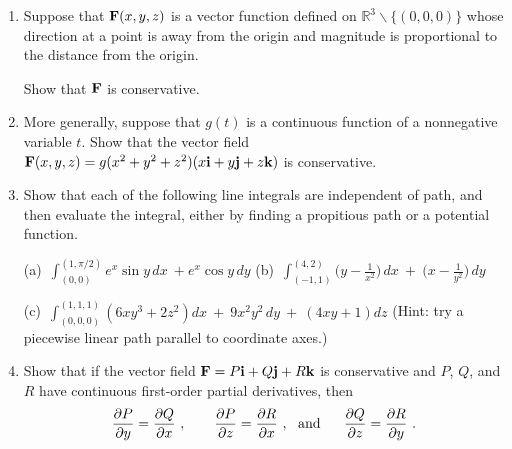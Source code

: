 \documentclass[12pt]{article}
\newcommand{\RR}{{\mathbb R}}  %
\newcommand{\bfF}{{\bf F}}    %
\newcommand{\bfi}{{\bf i}}    %
\newcommand{\bfj}{{\bf j}}    %
\newcommand{\bfk}{{\bf k}}    %
\begin{document}
\begin{enumerate}
\item Suppose that $\bfF(x,y,z)$ is a vector function defined on $\RR^{3}\smallsetminus\{(0,0,0)\}$ whose direction at a point  is away
  from the origin and magnitude is proportional to the distance from the origin.

  Show that $\bfF$ is conservative.  \vspace{-2pt}

   
\item More generally, suppose that $g(t)$ is a continuous function of a nonnegative variable $t$.
  Show that the vector field $\bfF(x,y,z)=g(x^2+y^2+z^2) ( x\bfi + y \bfj + z \bfk)$ is conservative.\vspace{-2pt}
   
 
   
\item Show that each of the following line integrals are independent of path, and then evaluate the integral, either by finding a propitious
  path or a potential function.
  
  (a)\ ${\displaystyle \int_{(0,0)}^{(1,\pi/2)} e^x \sin y\, dx \ + e^x \cos y\, dy}$
  \qquad
  (b)\ ${\displaystyle \int_{(-1,1)}^{(4,2)} \bigl(y - \frac{1}{x^2}\bigr)\, dx\ +\ \bigl(x - \frac{1}{y^2}\bigr)\, dy}$\vspace{4pt}

  (c)\ ${\displaystyle \int_{(0,0,0)}^{(1,1,1)} (6x y^3 + 2z^2) dx\ +\ 9x^2y^2\,dy\ +\ (4xy+1)dz}$\newline
  (Hint: try a piecewise linear path parallel to coordinate axes.)
 \vspace{-2pt}

   
\item Show that if the vector field $\bfF= P\bfi + Q\bfj + R\bfk$ is conservative and $P$, $Q$, and $R$ have continuous first-order partial
  derivatives, then\vspace{-4pt}
  \[
  \frac{\partial P}{\partial y}=\frac{\partial Q}{\partial x}\ ,
  \qquad
  \frac{\partial P}{\partial z}=\frac{\partial R}{\partial x}\ , \ \mbox{ and }\ 
  \quad
  \frac{\partial Q}{\partial z}=\frac{\partial R}{\partial y}\ .
  \vspace{-2pt}
  \]


\end{enumerate}
\end{document}
